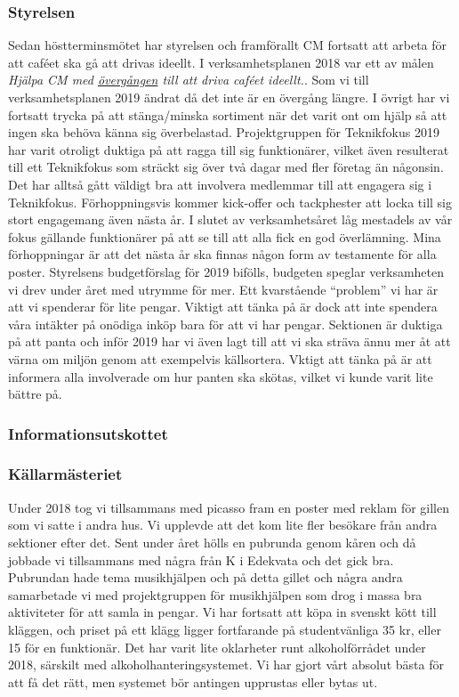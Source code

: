 \documentclass[../_main/handlingar.tex]{subfiles}
\begin{document}

\subsubsection*{Styrelsen}
Sedan höstterminsmötet har styrelsen och framförallt CM fortsatt att arbeta för att caféet ska gå att drivas ideellt. I verksamhetsplanen 2018 var ett av målen \textit{Hjälpa CM med \underline{övergången} till att driva caféet ideellt.}. Som vi till verksamhetsplanen 2019 ändrat då det inte är en övergång längre. I övrigt har vi fortsatt trycka på att stänga/minska sortiment när det varit ont om hjälp så att ingen ska behöva känna sig överbelastad.
Projektgruppen för Teknikfokus 2019 har varit otroligt duktiga på att ragga till sig funktionärer, vilket även resulterat till ett Teknikfokus som sträckt sig över två dagar med fler företag än någonsin. Det har alltså gått väldigt bra att involvera medlemmar till att engagera sig i Teknikfokus. Förhoppningsvis kommer kick-offer och tackphester att locka till sig stort engagemang även nästa år.
I slutet av verksamhetsåret låg mestadels av vår fokus gällande funktionärer på att se till att alla fick en god överlämning. Mina förhoppningar är att det nästa år ska finnas någon form av testamente för alla poster.
Styrelsens budgetförslag för 2019 bifölls, budgeten speglar verksamheten vi drev under året med utrymme för mer. Ett kvarstående ``problem'' vi har är att vi spenderar för lite pengar. Viktigt att tänka på är dock att inte spendera våra intäkter på onödiga inköp bara för att vi har pengar.
Sektionen är duktiga på att panta och inför 2019 har vi även lagt till att vi ska sträva ännu mer åt att värna om miljön genom att exempelvis källsortera. Vktigt att tänka på är att informera alla involverade om hur panten ska skötas, vilket vi kunde varit lite bättre på.  

\subsubsection*{Informationsutskottet}

\subsubsection*{Källarmästeriet}

Under 2018 tog vi tillsammans med picasso fram en poster med reklam för gillen som vi satte i andra
hus. Vi upplevde att det kom lite fler besökare från andra sektioner efter det. Sent under året hölls
en pubrunda genom kåren och då jobbade vi tillsammans med några från K i Edekvata och det gick
bra. Pubrundan hade tema musikhjälpen och på detta gillet och några andra samarbetade vi med
projektgruppen för musikhjälpen som drog i massa bra aktiviteter för att samla in pengar.
Vi har fortsatt att köpa in svenskt kött till kläggen, och priset på ett klägg ligger fortfarande på
studentvänliga 35 kr, eller 15 för en funktionär.
Det har varit lite oklarheter runt alkoholförrådet under 2018, särskilt med alkoholhanteringsystemet.
Vi har gjort vårt absolut bästa för att få det rätt, men systemet bör antingen upprustas eller bytas ut.
\end{document}
